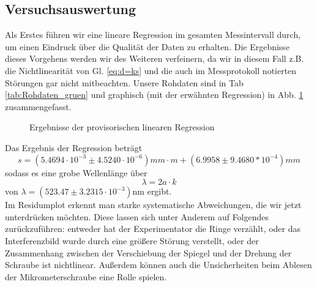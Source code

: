 \documentclass[12pt,a4paper]{article}
\begin{document}
\subsection{Versuchsauswertung}
Als Erstes führen wir eine lineare Regression im gesamten Messintervall durch, um einen Eindruck über die Qualität der Daten zu erhalten. Die Ergebnisse dieses Vorgehens werden wir des Weiteren verfeinern, da wir in diesem Fall z.B. die Nichtlinearität von Gl. \ref{eq:d=ks} und die auch im Messprotokoll notierten Störungen gar nicht mitbeachten. Unsere Rohdaten sind in Tab \ref{tab:Rohdaten_gruen} und graphisch (mit der erwähnten Regression) in Abb. \ref{fig:lambdarohlinreg} zusammengefasst.
\begin{figure}[H]
	\centering
	\qquad
	\caption{Ergebnisse der provisorischen linearen Regression}
	\label{fig:lambdarohlinreg}
\end{figure}
Das Ergebnis der Regression beträgt
\begin{equation*}
s = (5.4694\cdot10^{-3}\pm4.5240\cdot10^{-6})mm\cdot m+(6.9958\pm9.4680*10^{-4})mm
\end{equation*}
sodass es eine grobe Wellenlänge über
\begin{equation}
	\lambda = 2a\cdot k
	\label{eq:l=2ak}
\end{equation}
von $\lambda=(523.47\pm3.2315\cdot10^{-3})$nm ergibt.\\
Im Residumplot erkennt man starke systematische Abweichungen, die wir jetzt unterdrücken möchten. Diese lassen sich unter Anderem auf Folgendes zurückzuführen: entweder hat der Experimentator die Ringe verzählt, oder das Interferenzbild wurde durch eine größere Störung verstellt, oder der Zusammenhang zwischen der Verschiebung der Spiegel und der Drehung der Schraube ist nichtlinear. Außerdem können auch die Unsicherheiten beim Ablesen der Mikrometerschraube eine Rolle spielen.\\
\end{document}
